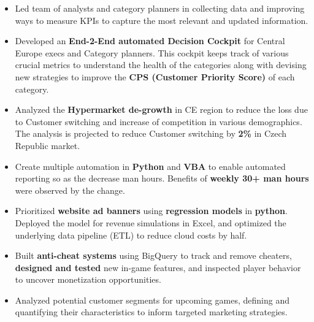 \vspace{2pt}
\begin{itemize}
  \item Led team of analysts and category planners in collecting data and improving ways to measure KPIs to capture the most relevant and updated information.
  \item Developed an \textbf{End-2-End automated Decision Cockpit} for Central Europe execs and Category planners. This cockpit keeps track of various crucial metrics to understand the health of the categories along with devising new strategies to improve the \textbf{CPS (Customer Priority Score)} of each category.
  \item Analyzed the \textbf{Hypermarket de-growth} in CE region to reduce the loss due to Customer switching and increase of competition in various demographics. The analysis is projected to reduce Customer switching by \textbf{2\%} in Czech Republic market.
  \item Create multiple automation in \textbf{Python} and \textbf{VBA} to enable automated reporting so as the decrease man hours. Benefits of \textbf{weekly 30+ man hours} were observed by the change.
\end{itemize}
{\footnotesize{     }}


\vspace{2pt}
\begin{itemize}
  \item Prioritized \textbf{website ad banners} using \textbf{regression models} in \textbf{python}. Deployed the model for revenue simulations in Excel, and optimized the underlying data pipeline (ETL) to reduce cloud costs by half.
  \item Built \textbf{anti-cheat systems} using BigQuery to track and remove cheaters, \textbf{designed and tested} new in-game features, and inspected player behavior to uncover monetization opportunities.
  \item Analyzed potential customer segments for upcoming games, defining and quantifying their characteristics to inform targeted marketing strategies.
\end{itemize}
{\footnotesize{       }}


